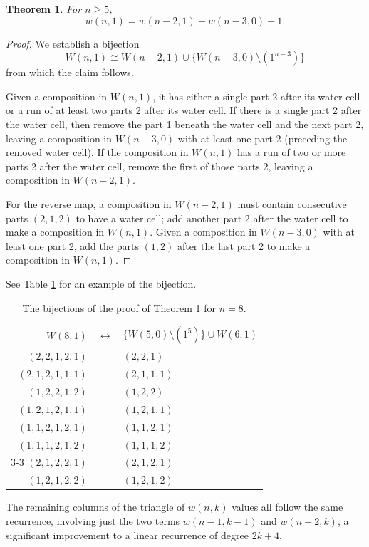\documentclass[]{interact}
\theoremstyle{plain}
\numberwithin{equation}{section} %
\newtheorem{theorem}[thm]{Theorem}
\numberwithin{table}{section} %
\numberwithin{figure}{section}
\begin{document}
\begin{theorem} \label{wc1}
For $n \ge 5$, \[w(n,1) = w(n-2,1) + w(n-3,0) - 1.\]
\end{theorem}

\begin{proof}
We establish a bijection
\[W(n,1) \cong W(n-2,1) \cup \{W(n-3,0) \setminus (1^{n-3})\}\]
from which the claim follows.

Given a composition in $W(n,1)$, it has either a single part 2 after its water cell or a run of at least two parts 2 after its water cell.  If there is a single part 2 after the water cell, then remove the part 1 beneath the water cell and the next part 2, leaving a composition in $W(n-3,0)$ with at least one part 2 (preceding the removed water cell).  If the composition in $W(n,1)$ has a run of two or more parts 2 after the water cell, remove the first of those parts 2, leaving a composition in $W(n-2,1)$.    

For the reverse map, a composition in $W(n-2,1)$ must contain consecutive parts $(2,1,2)$ to have a water cell; add another part 2 after the water cell to make a composition in $W(n,1)$.  Given a composition in $W(n-3,0)$ with at least one part 2, add the parts $(1,2)$ after the last part 2 to make a composition in $W(n,1)$.
\end{proof}

See Table \ref{wc1ex} for an example of the bijection.

\begin{table}[ht]
\caption{The bijections of the proof of Theorem \ref{wc1} for $n= 8$.} 
\medskip
\centering
\begin{tabular}{rcl}
$W(8,1)$ & $\longleftrightarrow$ & $\{W(5,0) \setminus (1^5)\} \cup W(6,1)$ \\ \hline
$(2,2,1,2,1)$ & & $(2,2,1)$ \\
$(2,1,2,1,1,1)$ & & $(2,1,1,1)$ \\ 
$(1,2,2,1,2)$ & & $(1,2,2)$ \\
$(1,2,1,2,1,1)$ & & $(1,2,1,1)$ \\
$(1,1,2,1,2,1)$ & & $(1,1,2,1)$ \\ 
$(1,1,1,2,1,2)$ & & $(1,1,1,2)$  \\ \cline{3-3}
$(2,1,2,2,1)$ & & $(2,1,2,1)$ \\
$(1,2,1,2,2)$ & & $(1,2,1,2)$
\end{tabular}
\label{wc1ex}
\end{table}

The remaining columns of the triangle of $w(n,k)$ values all follow the same recurrence, involving just the two terms $w(n-1,k-1)$ and $w(n-2,k)$, a significant improvement to a linear recurrence of degree $2k+4$.
\end{document}
